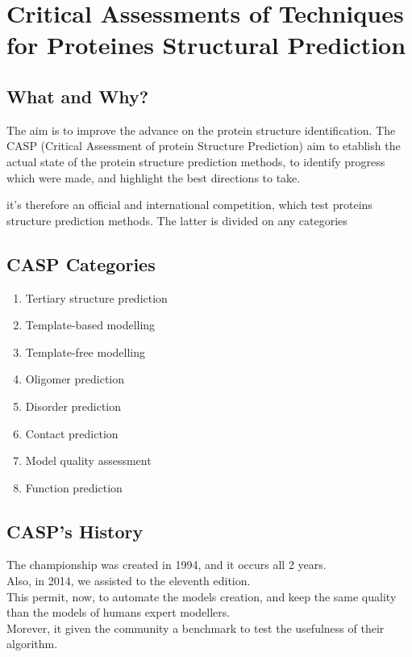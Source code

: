 \section{Critical Assessments  of Techniques  for Proteines Structural Prediction}
\subsection{What and Why?}

The aim is to improve the advance on the protein structure identification. 
The CASP (Critical Assessment of protein Structure Prediction) aim to etablish the actual state of the protein structure prediction methods, to identify progress which were made, and highlight the best directions to take.

it's therefore an official and international competition, which test proteins structure prediction methods. The latter is divided on any categories

\subsection{CASP Categories}
\begin{enumerate}
   \item Tertiary structure prediction
   \item Template-based modelling
   \item Template-free modelling
   \item Oligomer prediction
   \item Disorder prediction
   \item Contact prediction
   \item Model quality assessment
   \item Function prediction
\end{enumerate}

\subsection{CASP's History}
   The championship was created in 1994, and it occurs all 2 years.\\
   Also, in 2014, we assisted to the eleventh edition.\\

   This permit, now, to automate the models creation, and keep the same quality than the models of humans expert modellers.\\
   Morever, it given the community a benchmark to test the usefulness of their algorithm.\\
